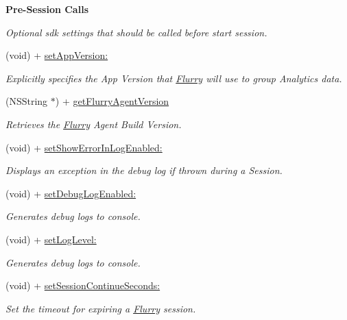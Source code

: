 \begin{Indent}\textbf{ Pre-\/\+Session Calls}\par
{\em Optional sdk settings that should be called before start session. }\begin{DoxyCompactItemize}
\item 
(void) + \hyperlink{interfaceFlurry_a4ccd9b24965b9f514f525a9eb15d071d}{set\+App\+Version\+:}
\begin{DoxyCompactList}\small\item\em Explicitly specifies the App Version that \hyperlink{interfaceFlurry}{Flurry} will use to group Analytics data. \end{DoxyCompactList}\item 
(N\+S\+String $\ast$) + \hyperlink{interfaceFlurry_a7bb5278edece8dd7d97ebd5ccedb68cf}{get\+Flurry\+Agent\+Version}
\begin{DoxyCompactList}\small\item\em Retrieves the \hyperlink{interfaceFlurry}{Flurry} Agent Build Version. \end{DoxyCompactList}\item 
(void) + \hyperlink{interfaceFlurry_a642b4d19fc67250c24dafe66bb40ea71}{set\+Show\+Error\+In\+Log\+Enabled\+:}
\begin{DoxyCompactList}\small\item\em Displays an exception in the debug log if thrown during a Session. \end{DoxyCompactList}\item 
(void) + \hyperlink{interfaceFlurry_a68104a89eff2e63d71b413d3212c5178}{set\+Debug\+Log\+Enabled\+:}
\begin{DoxyCompactList}\small\item\em Generates debug logs to console. \end{DoxyCompactList}\item 
(void) + \hyperlink{interfaceFlurry_ab717465e705b23c80253dddae321f5bc}{set\+Log\+Level\+:}
\begin{DoxyCompactList}\small\item\em Generates debug logs to console. \end{DoxyCompactList}\item 
(void) + \hyperlink{interfaceFlurry_a1b79d4d804074f4b66f3434d9318ceee}{set\+Session\+Continue\+Seconds\+:}
\begin{DoxyCompactList}\small\item\em Set the timeout for expiring a \hyperlink{interfaceFlurry}{Flurry} session. \end{DoxyCompactList}\item 

\end{DoxyCompactItemize}
\end{Indent}
